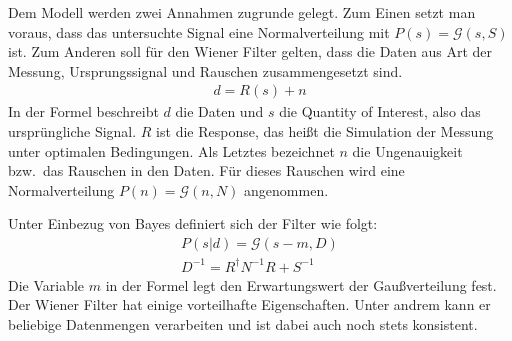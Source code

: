 \documentclass[]{dsadokumentation}
\begin{document}
Dem Modell werden zwei Annahmen zugrunde gelegt.
Zum Einen setzt man voraus, dass das untersuchte Signal eine Normalverteilung mit $P(s) = \mathcal{G}(s,S)$ ist.
Zum Anderen soll für den Wiener Filter gelten, dass die Daten aus Art der Messung, Ursprungssignal und Rauschen zusammengesetzt sind.
\begin{eqnarray}
  d = R(s) + n
\end{eqnarray}
In der Formel beschreibt $d$ die Daten und $s$ die Quantity of Interest, also das ursprüngliche Signal.
$R$ ist die Response, das heißt die Simulation der Messung unter optimalen Bedingungen.
Als Letztes bezeichnet $n$ die Ungenauigkeit bzw.\ das Rauschen in den Daten.
Für dieses Rauschen wird eine Normalverteilung $P(n) = \mathcal{G}(n,N)$ angenommen.

Unter Einbezug von Bayes definiert sich der Filter wie folgt:
\begin{eqnarray}
  P(s|d) = \mathcal{G}(s-m,D)\\
  D^{-1} = R^{\dagger} N^{-1}R + S^{-1}
\end{eqnarray}
Die Variable $m$ in der Formel legt den Erwartungswert der Gaußverteilung fest.
Der Wiener Filter hat einige vorteilhafte Eigenschaften.
Unter andrem kann er beliebige Datenmengen verarbeiten und ist dabei auch noch stets konsistent.

\printbibliography{}
\end{document}
